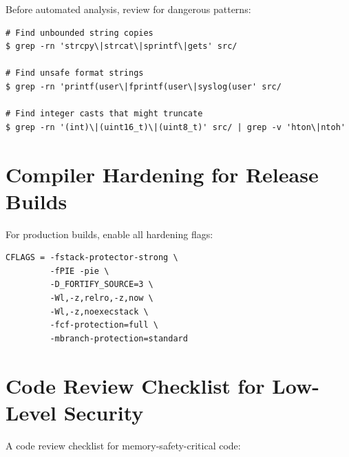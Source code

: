 \begin{example}
	Before automated analysis, review for dangerous patterns:
	\begin{lstlisting}[caption=Grep patterns for security review]
# Find unbounded string copies
$ grep -rn 'strcpy\|strcat\|sprintf\|gets' src/

# Find unsafe format strings
$ grep -rn 'printf(user\|fprintf(user\|syslog(user' src/

# Find integer casts that might truncate
$ grep -rn '(int)\|(uint16_t)\|(uint8_t)' src/ | grep -v 'hton\|ntoh'
	\end{lstlisting}
\end{example}

\section{Compiler Hardening for Release Builds}

For production builds, enable all hardening flags:

\begin{lstlisting}[caption=Recommended compiler flags for security]
CFLAGS = -fstack-protector-strong \
         -fPIE -pie \
         -D_FORTIFY_SOURCE=3 \
         -Wl,-z,relro,-z,now \
         -Wl,-z,noexecstack \
         -fcf-protection=full \
         -mbranch-protection=standard
\end{lstlisting}

\section{Code Review Checklist for Low-Level Security}

A code review checklist for memory-safety-critical code:

